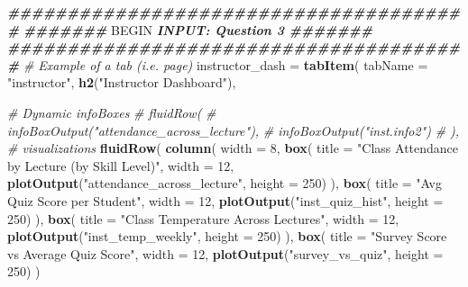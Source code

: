 \documentclass[
]{article}
\newenvironment{Shaded}{\begin{snugshade}}{\end{snugshade}}
\newcommand{\AttributeTok}[1]{\textcolor[rgb]{0.13,0.29,0.53}{#1}}
\newcommand{\CommentTok}[1]{\textcolor[rgb]{0.56,0.35,0.01}{\textit{#1}}}
\newcommand{\DecValTok}[1]{\textcolor[rgb]{0.00,0.00,0.81}{#1}}
\newcommand{\DocumentationTok}[1]{\textcolor[rgb]{0.56,0.35,0.01}{\textbf{\textit{#1}}}}
\newcommand{\FunctionTok}[1]{\textcolor[rgb]{0.13,0.29,0.53}{\textbf{#1}}}
\newcommand{\NormalTok}[1]{#1}
\newcommand{\OtherTok}[1]{\textcolor[rgb]{0.56,0.35,0.01}{#1}}
\newcommand{\RegionMarkerTok}[1]{#1}
\newcommand{\StringTok}[1]{\textcolor[rgb]{0.31,0.60,0.02}{#1}}
\begin{document}
\begin{Shaded}
\begin{Highlighting}[]
\DocumentationTok{\#\#\#\#\#\#\#\#\#\#\#\#\#\#\#\#\#\#\#\#\#\#\#\#\#\#\#\#\#\#\#\#\#\#\#\#\#\#\#}
\DocumentationTok{\#\#\#\#\#\#\# }\RegionMarkerTok{BEGIN}\DocumentationTok{ INPUT: Question 3 \#\#\#\#\#\#\#}
\DocumentationTok{\#\#\#\#\#\#\#\#\#\#\#\#\#\#\#\#\#\#\#\#\#\#\#\#\#\#\#\#\#\#\#\#\#\#\#\#\#\#\#}
\CommentTok{\# Example of a tab (i.e. page)}
\NormalTok{instructor\_dash }\OtherTok{=} \FunctionTok{tabItem}\NormalTok{(}
    \AttributeTok{tabName =} \StringTok{"instructor"}\NormalTok{,}
    \FunctionTok{h2}\NormalTok{(}\StringTok{"Instructor Dashboard"}\NormalTok{),}
    
    \CommentTok{\# Dynamic infoBoxes}
   \CommentTok{\# fluidRow(}
   \CommentTok{\#   infoBoxOutput("attendance\_across\_lecture"),}
   \CommentTok{\#   infoBoxOutput("inst.info2")}
   \CommentTok{\# ),}
    \CommentTok{\# visualizations}
    \FunctionTok{fluidRow}\NormalTok{(}
      \FunctionTok{column}\NormalTok{(}
        \AttributeTok{width =} \DecValTok{8}\NormalTok{,}
        \FunctionTok{box}\NormalTok{(}
            \AttributeTok{title =} \StringTok{"Class Attendance by Lecture (by Skill Level)"}\NormalTok{,}
            \AttributeTok{width =} \DecValTok{12}\NormalTok{,}
            \FunctionTok{plotOutput}\NormalTok{(}\StringTok{"attendance\_across\_lecture"}\NormalTok{, }\AttributeTok{height =} \DecValTok{250}\NormalTok{)}
\NormalTok{        ),}
        \FunctionTok{box}\NormalTok{(}
            \AttributeTok{title =} \StringTok{"Avg Quiz Score per Student"}\NormalTok{,}
            \AttributeTok{width =} \DecValTok{12}\NormalTok{,}
            \FunctionTok{plotOutput}\NormalTok{(}\StringTok{"inst\_quiz\_hist"}\NormalTok{, }\AttributeTok{height =} \DecValTok{250}\NormalTok{)}
\NormalTok{        ),}
        \FunctionTok{box}\NormalTok{(}
            \AttributeTok{title =} \StringTok{"Class Temperature Across Lectures"}\NormalTok{,}
            \AttributeTok{width =} \DecValTok{12}\NormalTok{,}
            \FunctionTok{plotOutput}\NormalTok{(}\StringTok{"inst\_temp\_weekly"}\NormalTok{, }\AttributeTok{height =} \DecValTok{250}\NormalTok{)}
\NormalTok{        ),}
        \FunctionTok{box}\NormalTok{(}
            \AttributeTok{title =} \StringTok{"Survey Score vs Average Quiz Score"}\NormalTok{,}
            \AttributeTok{width =} \DecValTok{12}\NormalTok{,}
            \FunctionTok{plotOutput}\NormalTok{(}\StringTok{"survey\_vs\_quiz"}\NormalTok{, }\AttributeTok{height =} \DecValTok{250}\NormalTok{)}
\NormalTok{        )}

\end{Highlighting}
\end{Shaded}
\end{document}
